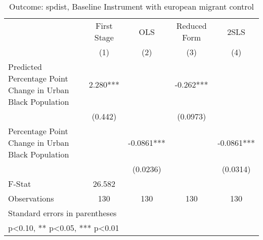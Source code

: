 \begin{table}[htbp]\centering
\def\sym#1{\ifmmode^{#1}\else\(^{#1}\)\fi}
\caption{Outcome: spdist, Baseline Instrument with european migrant control}
\begin{tabular}{l*{4}{c}}
\toprule
                    & First Stage   &         OLS   &Reduced Form   &        2SLS   \\
                    &\multicolumn{1}{c}{(1)}   &\multicolumn{1}{c}{(2)}   &\multicolumn{1}{c}{(3)}   &\multicolumn{1}{c}{(4)}   \\
\midrule
Predicted Percentage Point Change in Urban Black Population&       2.280***&               &      -0.262***&               \\
                    &     (0.442)   &               &    (0.0973)   &               \\
\addlinespace
Percentage Point Change in Urban Black Population&               &     -0.0861***&               &     -0.0861***\\
                    &               &    (0.0236)   &               &    (0.0314)   \\
\midrule
F-Stat              &      26.582   &               &               &               \\
Observations        &         130   &         130   &         130   &         130   \\
\bottomrule
\multicolumn{5}{l}{\footnotesize Standard errors in parentheses}\\
\multicolumn{5}{l}{\footnotesize * p<0.10, ** p<0.05, *** p<0.01}\\
\end{tabular}
\end{table}
